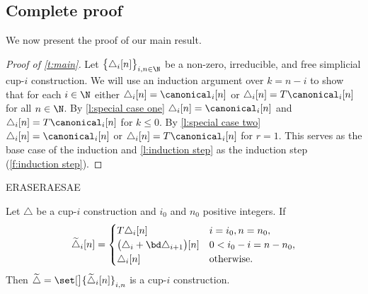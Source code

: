 \subsection{Complete proof}\label{ss:proof}

We now present the proof of our main result.

\begin{proof}[Proof of \cref{t:main}]
	Let $\big\{ \triangle_i [n] \big\}_{i,n\in\N}$ be a non-zero, irreducible, and free simplicial \mbox{cup-$i$} construction.
	We will use an induction argument over $k = n-i$ to show that for each $i \in \N$ either $\triangle_i [n] = \canonical_i [n]$ or
	$\triangle_i [n] = T \canonical_i [n]$ for all $n \in \N$.
	By \cref{l:special case one} $\triangle_i [n] = \canonical_i [n]$ and $\triangle_i [n] = T \canonical_i [n]$ for $k \leq 0$.
	By \cref{l:special case two} $\triangle_i [n] = \canonical_i [n]$ or $\triangle_i [n] = T \canonical_i [n]$ for $r = 1$.
	This serves as the base case of the induction and \cref{l:induction step} as the induction step (\cref{f:induction step}).
\end{proof}


\newpage
ERASERAESAE
\begin{proposition}
	Let $\triangle$ be a cup-$i$ construction and $i_0$ and $n_0$ positive integers.
	If
	\[
	\widetilde\triangle_i[n] =
	\begin{cases}
		T\triangle_{i}[n] & i = i_0,n=n_0, \\
		\big(\triangle_{i} + \bd \triangle_{i+1}\big)[n] & 0 < i_0-i =n-n_0, \\
		\triangle_{i}[n] & \text{otherwise}.
	\end{cases}
	\]
	Then $\widetilde\triangle = \set[\big]{\widetilde\triangle_i[n]}_{i,n}$ is a cup-$i$ construction.
\end{proposition}

